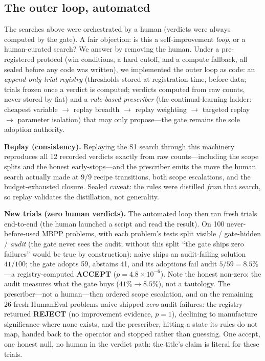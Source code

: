 \documentclass{article}
\begin{document}
\subsection{The outer loop, automated}
\label{sec:automated}

The searches above were orchestrated by a human (verdicts were always computed by the gate). A fair
objection: is this a self-improvement \emph{loop}, or a human-curated search? We answer by removing the
human. Under a pre-registered protocol (win conditions, a hard cutoff, and a compute fallback, all
sealed before any code was written), we implemented the outer loop as code: an \emph{append-only trial
registry} (thresholds stored at registration time, before data; trials frozen once a verdict is
computed; verdicts computed from raw counts, never stored by fiat) and a \emph{rule-based prescriber}
(the continual-learning ladder: cheapest variable $\to$ replay breadth $\to$ replay weighting $\to$
targeted replay $\to$ parameter isolation) that may only propose---the gate remains the sole adoption
authority.

\textbf{Replay (consistency).} Replaying the S1 search through this machinery reproduces all 12
recorded verdicts exactly from raw counts---including the scope splits and the honest early-stops---and
the prescriber emits the move the human search actually made at 9/9 recipe transitions, both scope
escalations, and the budget-exhausted closure. Sealed caveat: the rules were distilled \emph{from} that
search, so replay validates the distillation, not generality.

\textbf{New trials (zero human verdicts).} The automated loop then ran fresh trials end-to-end (the
human launched a script and read the result). On 100 never-before-used MBPP problems, with each
problem's tests split visible / gate-hidden / \emph{audit} (the gate never sees the audit; without this
split ``the gate ships zero failures'' would be true by construction): naive ships an audit-failing
solution $41/100$; the gate adopts 59, abstains 41, and its adoptions fail audit $5/59 = 8.5\%$---a
registry-computed \textbf{ACCEPT} ($p = 4.8\times10^{-6}$). Note the honest non-zero: the audit
measures what the gate buys ($41\%\!\to\!8.5\%$), not a tautology. The prescriber---not a
human---then ordered scope escalation, and on the remaining 26 fresh HumanEval problems naive shipped
\emph{zero} audit failures: the registry returned \textbf{REJECT} (no improvement evidence, $p=1$),
declining to manufacture significance where none exists, and the prescriber, hitting a state its rules
do not map, handed back to the operator and stopped rather than guessing. One accept, one honest null,
no human in the verdict path: the title's claim is literal for these trials.
\end{document}
